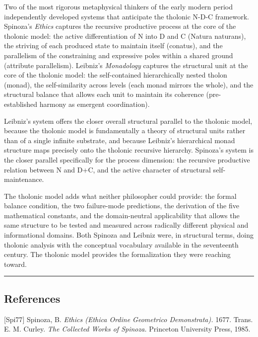 \documentclass[
  11pt,
  letterpaper,
]{article}
\begin{document}
Two of the most rigorous metaphysical thinkers of the early modern
period independently developed systems that anticipate the tholonic
N-D-C framework. Spinoza's \emph{Ethics} captures the recursive
productive process at the core of the tholonic model: the active
differentiation of N into D and C (Natura naturans), the striving of
each produced state to maintain itself (conatus), and the parallelism of
the constraining and expressive poles within a shared ground (attribute
parallelism). Leibniz's \emph{Monadology} captures the structural unit
at the core of the tholonic model: the self-contained hierarchically
nested tholon (monad), the self-similarity across levels (each monad
mirrors the whole), and the structural balance that allows each unit to
maintain its coherence (pre-established harmony as emergent
coordination).

Leibniz's system offers the closer overall structural parallel to the
tholonic model, because the tholonic model is fundamentally a theory of
structural units rather than of a single infinite substrate, and because
Leibniz's hierarchical monad structure maps precisely onto the tholonic
recursive hierarchy. Spinoza's system is the closer parallel
specifically for the process dimension: the recursive productive
relation between N and D+C, and the active character of structural
self-maintenance.

The tholonic model adds what neither philosopher could provide: the
formal balance condition, the two failure-mode predictions, the
derivation of the five mathematical constants, and the domain-neutral
applicability that allows the same structure to be tested and measured
across radically different physical and informational domains. Both
Spinoza and Leibniz were, in structural terms, doing tholonic analysis
with the conceptual vocabulary available in the seventeenth century. The
tholonic model provides the formalization they were reaching toward.

\begin{center}\rule{0.5\linewidth}{0.5pt}\end{center}

\subsection{References}\label{references}

{[}Spi77{]} Spinoza, B. \emph{Ethics (Ethica Ordine Geometrico
Demonstrata).} 1677. Trans. E. M. Curley. \emph{The Collected Works of
Spinoza.} Princeton University Press, 1985.
\end{document}

